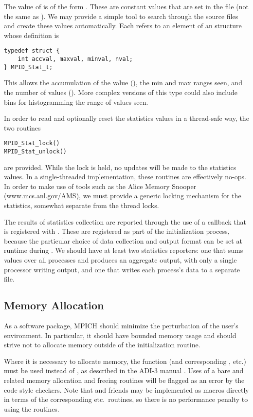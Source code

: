 \documentclass{article}
\begin{document}
The value of  is of the form .  These are
constant values that are set in the file  (not the
same as ).  We may provide a
simple tool to search through the source files and create these values
automatically.  Each  refers to an element of an
 structure whose definition is
\begin{verbatim}
typedef struct {
    int accval, maxval, minval, nval;
} MPID_Stat_t;
\end{verbatim}
This allows the accumulation of the value (), the min and max
ranges seen, and the number of values ().  More complex versions of
this type could also include bins for histogramming the range of values seen.

In order to read and optionally reset the statistics values in a thread-safe
way, the two routines
\begin{verbatim}
MPID_Stat_lock()
MPID_Stat_unlock()
\end{verbatim}
are provided.  While the lock is held, no updates will be made to the
statistics values.  In a single-threaded implementation, these routines are
effectively no-ops.  
In order to make use of tools such as the Alice Memory Snooper
(\url{www.mcs.anl.gov/AMS}), we must provide a generic locking
mechanism for the statistics, somewhat separate from the thread locks.  

The results of statistics collection are reported through the use of a
callback that is registered with .  These are
registered as part of the initialization process, because the
particular choice of data collection and output format can be set at
runtime during .  We should have at least two
statistics reporters: one that sums values over all processes and
produces an aggregate output, with only a single processor writing
output, and one that writes each process's data to a separate file.

\subsection{Memory Allocation}
As a software package, MPICH should minimize the perturbation of the user's
environment.  In 
particular, it should have bounded memory usage and should strive not to
allocate memory outside of the initialization routine.  

Where it is necessary to allocate memory, the function 
(and corresponding , etc.) must be used instead of
, as described in the ADI-3 manual \cite{adi3man}.  Uses of a
bare  and related memory allocation and freeing routines will be
flagged as an error by the code style checkers.  Note that 
and friends may be implemented as macros directly in terms of the
corresponding  etc.~routines, so there is no performance penalty
to using the  routines.
\end{document}
